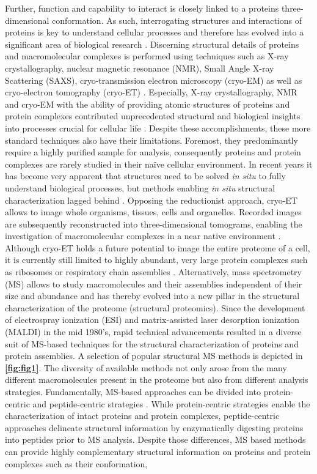 Further, function and capability to interact is closely linked to a proteins three-dim\-ensional conformation. As such, interrogating structures and interactions of proteins is key to understand cellular processes and therefore has evolved into a significant area of biological research \cite{De_Las_Rivas_2010, Russell_2004}. Discerning structural details of proteins and macromolecular complexes is performed using techniques such as X-ray crystallography, nuclear magnetic resonance (NMR), Small Angle X-ray Scattering (SAXS), cryo-transmission electron microscopy (cryo-EM) as well as cryo-electron tomography (cryo-ET) \cite{Cerofolini_2019, Dunstone_2017}. Especially, X-ray crystallography, NMR and cryo-EM with the ability of providing atomic structures of proteins and protein complexes contributed unprecedented structural and biological insights into processes crucial for cellular life \cite{Cate_1999, Englmeier_2019, O'Connell_2009}. Despite these accomplishments, these more standard techniques also have their limitations. Foremost, they predominantly require a highly purified sample for analysis, consequently proteins and protein complexes are rarely studied in their naïve cellular environment. In recent years it has become very apparent that structures need to be solved \emph{in situ} to fully understand biological processes, but methods enabling \emph{in situ} structural characterization lagged behind \cite{Lucic_2008}. Opposing the reductionist approach, cryo-ET allows to image whole organisms, tissues, cells and organelles. Recorded images are subsequently reconstructed into three-dimensional tomograms, enabling the investigation of macromolecular complexes in a near native environment \cite{Doerr_2017}. Although cryo-ET holds a future potential to image the entire proteome of a cell, it is currently still limited to highly abundant, very large protein complexes such as ribosomes or respiratory chain assemblies \cite{Davies_2014, Turk_2020}. Alternatively, mass spectrometry (MS) allows to study macromolecules and their assemblies independent of their size and abundance and has thereby evolved into a new pillar in the structural characterization of the proteome (structural proteomics). Since the development of electrospray ionization (ESI) \cite{Fenn_1989, Yamashita_1984} and matrix-assisted laser desorption ionization (MALDI) \cite{Karas_1988} in the mid 1980's, rapid technical advancements resulted in a diverse suit of MS-based techniques for the structural characterization of proteins and protein assemblies. A selection of popular structural MS methods is depicted in \textbf{\autoref{fig:fig1}}. The diversity of available methods not only arose from the many different macromolecules present in the proteome but also from different analysis strategies. Fundamentally, MS-based approaches can be divided into protein-centric and peptide-centric strategies \cite{Soldi_2013}. While protein-centric strategies enable the characterization of intact proteins and protein complexes, peptide-centric approaches delineate structural information by enzymatically digesting proteins into peptides prior to MS analysis. Despite those differences, MS based methods can provide highly complementary structural information on proteins and protein complexes such as their conformation, 